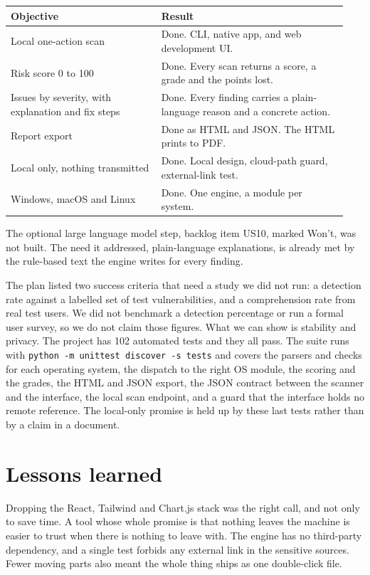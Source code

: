 \documentclass[11pt,a4paper]{article}
\begin{document}
\begin{table}[h]
\centering\small
\begin{tabular}{@{}p{0.42\linewidth}p{0.52\linewidth}@{}}
\toprule
Objective & Result \\
\midrule
Local one-action scan & Done. CLI, native app, and web development UI. \\
Risk score 0 to 100 & Done. Every scan returns a score, a grade and the points lost. \\
Issues by severity, with explanation and fix steps & Done. Every finding carries a plain-language reason and a concrete action. \\
Report export & Done as HTML and JSON. The HTML prints to PDF. \\
Local only, nothing transmitted & Done. Local design, cloud-path guard, external-link test. \\
Windows, macOS and Linux & Done. One engine, a module per system. \\
\bottomrule
\end{tabular}
\end{table}

The optional large language model step, backlog item US10, marked Won't, was not
built. The need it addressed, plain-language explanations, is already met by the
rule-based text the engine writes for every finding.

The plan listed two success criteria
that need a study we did not run: a detection rate against a labelled set of test
vulnerabilities, and a comprehension rate from real test users. We did not
benchmark a detection percentage or run a formal user survey, so we do not claim
those figures. What we can show is stability and privacy. The project has 102
automated tests and they all pass. The suite runs with
\texttt{python -m unittest discover -s tests} and covers the parsers and checks
for each operating system, the dispatch to the right OS module, the scoring and
the grades, the HTML and JSON export, the JSON contract between the scanner and
the interface, the local scan endpoint, and a guard that the interface holds no
remote reference. The local-only promise is held up by these last tests rather
than by a claim in a document.

\section{Lessons learned}

Dropping the React, Tailwind and Chart.js stack was the right call, and not only
to save time. A tool whose whole promise is that nothing leaves the machine is
easier to trust when there is nothing to leave with. The engine has no
third-party dependency, and a single test forbids any external link in the
sensitive sources. Fewer moving parts also meant the whole thing ships as one
double-click file.
\end{document}
